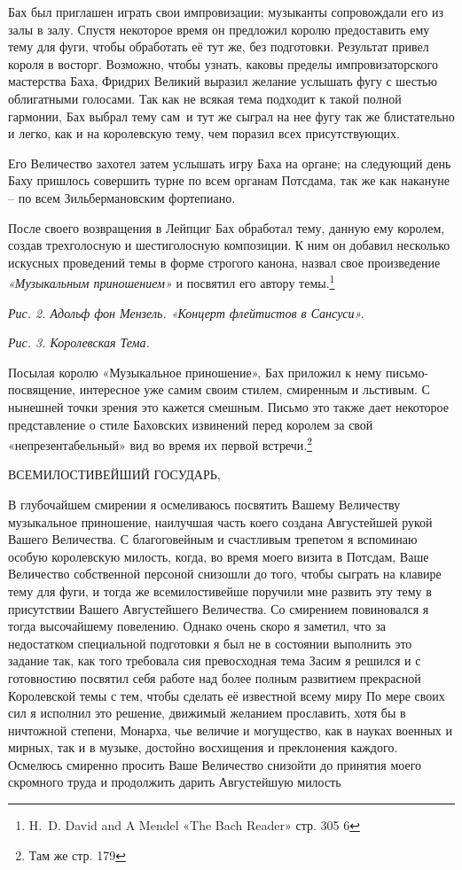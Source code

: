\documentclass[../main.tex]{subfiles}
\begin{document}
Бах был приглашен играть свои импровизации; музыканты сопровождали его из залы в залу. Спустя некоторое время он предложил королю предоставить ему тему для фуги, чтобы обработать её тут же, без подготовки. Результат привел короля в восторг. Возможно, чтобы узнать, каковы пределы импровизаторского мастерства Баха, Фридрих Великий выразил желание услышать фугу с шестью облигатными голосами. Так как не всякая тема подходит к такой полной гармонии, Бах выбрал тему сам~и тут же сыграл на нее фугу так же блистательно и легко, как и на королевскую тему, чем поразил всех присутствующих.

Его Величество захотел затем услышать игру Баха на органе; на следующий день Баху пришлось совершить турне по всем органам Потсдама, так же как накануне \--- по всем Зильбермановским фортепиано.

После своего возвращения в Лейпциг Бах обработал тему, данную ему королем, создав трехголосную и шестиголосную композиции. К ним он добавил несколько искусных проведений темы в форме строгого канона, назвал свое произведение \emph{«Музыкальным приношением»} и посвятил его автору темы.\footnote{H.~D. David and A Mendel «The Bach Reader» стр. 305 6}

\emph{Рис. 2. Адольф фон Мензель. «Концерт флейтистов в Сансуси».}

\emph{Рис. 3. Королевская Тема.}

Посылая королю «Музыкальное приношение», Бах приложил к нему письмо-посвящение, интересное уже самим своим стилем, смиренным и льстивым. С нынешней точки зрения это кажется смешным. Письмо это также дает некоторое представление о стиле Баховских извинений перед королем за свой «непрезентабельный» вид во время их первой встречи.\footnote{Там же стр. 179}

ВСЕМИЛОСТИВЕЙШИЙ ГОСУДАРЬ,

В глубочайшем смирении я осмеливаюсь посвятить Вашему Величеству музыкальное приношение, наилучшая часть коего создана Августейшей рукой Вашего Величества. С благоговейным и счастливым трепетом я вспоминаю особую королевскую милость, когда, во время моего визита в Потсдам, Ваше Величество собственной персоной снизошли до того, чтобы сыграть на клавире тему для фуги, и тогда же всемилостивейше поручили мне развить эту тему в присутствии Вашего Августейшего Величества. Со смирением повиновался я тогда высочайшему повелению. Однако очень скоро я заметил, что за недостатком специальной подготовки я был не в состоянии выполнить это задание так, как того требовала сия превосходная тема Засим я решился и с готовностию посвятил себя работе над более полным развитием прекрасной Королевской темы с тем, чтобы сделать её известной всему миру По мере своих сил я исполнил это решение, движимый желанием прославить, хотя бы в ничтожной степени, Монарха, чье величие и могущество, как в науках военных и мирных, так и в музыке, достойно восхищения и преклонения каждого. Осмелюсь смиренно просить Ваше Величество снизойти до принятия моего скромного труда и продолжить дарить Августейшую милость
\end{document}
